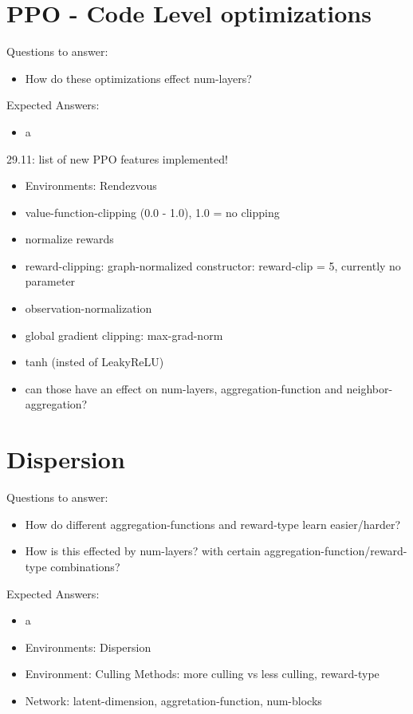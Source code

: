 \section{PPO - Code Level optimizations}
Questions to answer:
\begin{itemize}[noitemsep,nolistsep]
    \item How do these optimizations effect num-layers?
\end{itemize}
Expected Answers:
\begin{itemize}[noitemsep,nolistsep]
    \item a
\end{itemize}
29.11: list of new PPO features implemented!
\begin{itemize}[noitemsep,nolistsep]
    \item Environments: Rendezvous
    \item value-function-clipping (0.0 - 1.0), 1.0 = no clipping
    \item normalize rewards
    \item reward-clipping: graph-normalized constructor: reward-clip = 5, currently no parameter
    \item observation-normalization
    \item global gradient clipping: max-grad-norm
    \item tanh (insted of LeakyReLU)
    \item can those have an effect on num-layers, aggregation-function and neighbor-aggregation?
\end{itemize}

\section{Dispersion}
Questions to answer:
\begin{itemize}[noitemsep,nolistsep]
    \item How do different aggregation-functions and reward-type learn easier/harder?
    \item How is this effected by num-layers? with certain aggregation-function/reward-type combinations?
\end{itemize}
Expected Answers:
\begin{itemize}[noitemsep,nolistsep]
    \item a
\end{itemize}
\begin{itemize}[noitemsep,nolistsep]
    \item Environments: Dispersion
    \item Environment: Culling Methods: more culling vs less culling, reward-type
    \item Network: latent-dimension, aggretation-function, num-blocks
\end{itemize}